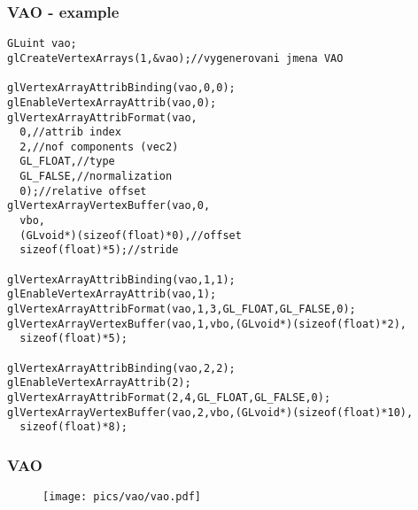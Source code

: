 \begin{frame}[fragile]
\frametitle{VAO - example}
{\tiny
\begin{verbatim}
GLuint vao;
glCreateVertexArrays(1,&vao);//vygenerovani jmena VAO

glVertexArrayAttribBinding(vao,0,0);
glEnableVertexArrayAttrib(vao,0);
glVertexArrayAttribFormat(vao,
  0,//attrib index
  2,//nof components (vec2)
  GL_FLOAT,//type
  GL_FALSE,//normalization
  0);//relative offset
glVertexArrayVertexBuffer(vao,0,
  vbo,
  (GLvoid*)(sizeof(float)*0),//offset
  sizeof(float)*5);//stride

glVertexArrayAttribBinding(vao,1,1);
glEnableVertexArrayAttrib(vao,1);
glVertexArrayAttribFormat(vao,1,3,GL_FLOAT,GL_FALSE,0);
glVertexArrayVertexBuffer(vao,1,vbo,(GLvoid*)(sizeof(float)*2),
  sizeof(float)*5);

glVertexArrayAttribBinding(vao,2,2);
glEnableVertexArrayAttrib(2);
glVertexArrayAttribFormat(2,4,GL_FLOAT,GL_FALSE,0);
glVertexArrayVertexBuffer(vao,2,vbo,(GLvoid*)(sizeof(float)*10),
  sizeof(float)*8);
\end{verbatim}
}
\end{frame}

\begin{frame}[fragile]
\frametitle{VAO}
  \begin{figure}[h]
  \texttt{[image: pics/vao/vao.pdf]}
  \end{figure}
\end{frame}

